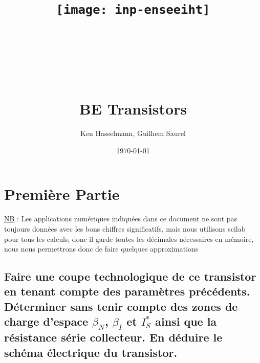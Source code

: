 \documentclass[10pt]{article}
\title{\texttt{[image: inp-enseeiht]} \\ ~ \\ ~ \\ ~ \\ ~ \\ BE Transistors }
\author{Ken Hasselmann, Guilhem Saurel}
\date{\today}
\begin{document}
 \begin{titlepage}
  \maketitle
  \tableofcontents
 \end{titlepage}

 \section{Première Partie}
  \ul{NB} : Les applications numériques indiquées dans ce document ne sont pas toujours données avec les bons chiffres significatifs, mais nous utilisons scilab pour tous les calculs, donc il garde toutes les décimales nécessaires en mémoire, nous nous permettrons donc de faire quelques approximations

  \subsection{Faire une coupe technologique de ce transistor en tenant compte des paramètres précédents. Déterminer sans tenir compte des zones de charge d’espace $\beta_N$, $\beta_I$ et $I_S^\ast$ ainsi que la résistance série collecteur. En déduire le schéma électrique du transistor.}
\end{document}
